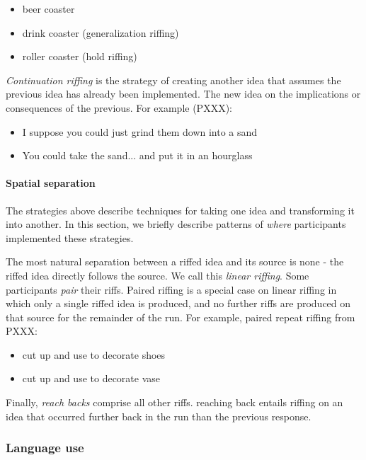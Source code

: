 \begin{itemize}
    \item beer coaster
    \item drink coaster (generalization riffing)
    \item roller coaster (hold riffing)
\end{itemize}

\emph{Continuation riffing} is the strategy of creating another idea that assumes the previous idea has already been implemented. The new idea on the implications or consequences of the previous. For example (PXXX):

\begin{itemize}
    \item I suppose you could just grind them down into a sand
    \item You could take the sand... and put it in an hourglass
\end{itemize}

\paragraph{Spatial separation}

The strategies above describe techniques for taking one idea and transforming it into another. In this section, we briefly describe patterns of \emph{where} participants implemented these strategies.

The most natural separation between a riffed idea and its source is none - the riffed idea directly follows the source. We call this \emph{linear riffing}. Some participants \emph{pair} their riffs. Paired riffing is a special case on linear riffing in which only a single riffed idea is produced, and no further riffs are produced on that source for the remainder of the run. For example, paired repeat riffing from PXXX:

\begin{itemize}
\item cut up and use to decorate shoes
\item cut up and use to decorate vase
\end{itemize}

Finally, \emph{reach backs} comprise all other riffs. reaching back entails riffing on an idea that occurred further back in the run than the previous response. 

\subsubsection{Language use}


